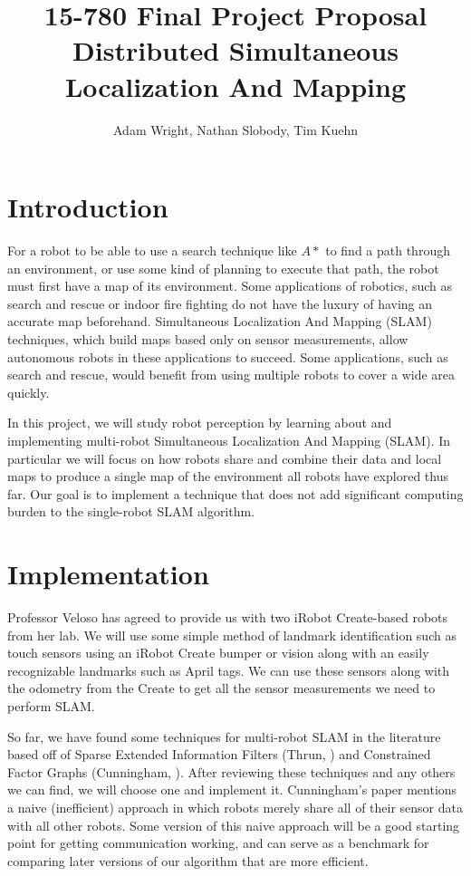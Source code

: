 \documentclass[11pt]{article}
\title{
15-780 Final Project Proposal \\ 
Distributed Simultaneous Localization And Mapping \\
}
\author{Adam Wright, Nathan Slobody, Tim Kuehn}
\begin{document}
\maketitle

\section{Introduction}

For a robot to be able to use a search technique like $A*$ to find a path through an environment, or use some kind of planning to execute that path, the robot must first have a map of its environment. Some applications of robotics, such as search and rescue or indoor fire fighting do not have the luxury of having an accurate map beforehand. Simultaneous Localization And Mapping (SLAM) techniques, which build maps based only on sensor measurements, allow autonomous robots in these applications to succeed. Some applications, such as search and rescue, would benefit from using multiple robots to cover a wide area quickly. 

In this project, we will study robot perception by learning about and implementing multi-robot Simultaneous Localization And Mapping (SLAM). In particular we will focus on how robots share and combine their data and local maps to produce a single map of the environment all robots have explored thus far. Our goal is to implement a technique that does not add significant computing burden to the single-robot SLAM algorithm.

\section{Implementation}

Professor Veloso has agreed to provide us with two iRobot Create-based robots from her lab. We will use some simple method of landmark identification such as touch sensors using an iRobot Create bumper or vision along with an easily recognizable landmarks such as April tags. We can use these sensors along with the odometry from the Create to get all the sensor measurements we need to perform SLAM. 

So far, we have found some techniques for multi-robot SLAM in the literature based off of Sparse Extended Information Filters (Thrun, \cite{thrun2003}) and Constrained Factor Graphs (Cunningham, \cite{cunningham2010}). After reviewing these techniques and any others we can find, we will choose one and implement it. Cunningham's paper mentions a naive (inefficient) approach in which robots merely share all of their sensor data with all other robots. Some version of this naive approach will be a good starting point for getting communication working, and can serve as a benchmark for comparing later versions of our algorithm that are more efficient.
\end{document}
